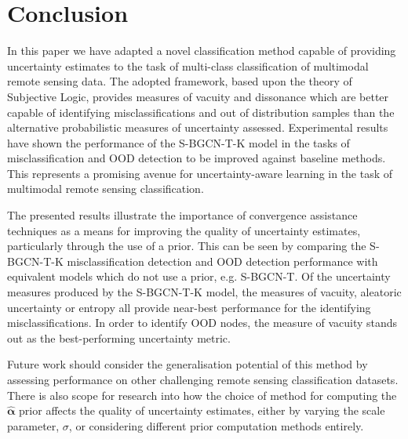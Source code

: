 \documentclass[
twocolumn,
]{ceurart}
\begin{document}
\section{Conclusion}
\label{sec::conclusion}

In this paper we have adapted a novel classification method capable of providing uncertainty estimates to the task of multi-class classification of multimodal remote sensing data.
The adopted framework, based upon the theory of Subjective Logic, provides measures of vacuity and dissonance which are better capable of identifying misclassifications and out of distribution samples than the alternative probabilistic measures of uncertainty assessed.
Experimental results have shown the performance of the S-BGCN-T-K model in the tasks of misclassification and OOD detection to be improved against baseline methods.
This represents a promising avenue for uncertainty-aware learning in the task of multimodal remote sensing classification.

The presented results illustrate the importance of convergence assistance techniques as a means for improving the quality of uncertainty estimates, particularly through the use of a prior.
This can be seen by comparing the S-BGCN-T-K misclassification detection and OOD detection performance with equivalent models which do not use a prior, e.g. S-BGCN-T.
Of the uncertainty measures produced by the S-BGCN-T-K model, the measures of vacuity, aleatoric uncertainty or entropy all provide near-best performance for the identifying misclassifications.
In order to identify OOD nodes, the measure of vacuity stands out as the best-performing uncertainty metric.

Future work should consider the generalisation potential of this method by assessing performance on other challenging remote sensing classification datasets.
There is also scope for research into how the choice of method for computing the $\hat{\boldsymbol{\alpha}}$ prior affects the quality of uncertainty estimates, either by varying the scale parameter, $\sigma$, or considering different prior computation methods entirely.


\end{document}
